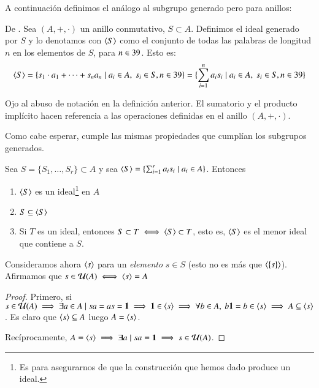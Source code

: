 A continuación definimos el análogo al subgrupo generado pero para anillos:

\begin{dfn}
	De \cite{dor96}. Sea $(A, +, \cdot)$ un anillo conmutativo, $S \subset A$. Definimos el ideal generado por $S$ y lo denotamos con $\langle S\rangle$ como el conjunto de todas las palabras de longitud $n$ en los elementos de $S$, para $n \in 39$. Esto es:
	\begin{align*}
		\langle S\rangle = \{s_1\cdot a_1 + \dots + s_na_n \mid a_i \in A,\ s_i \in S, n \in 39\} = \{\sum_{i=1}^{n} a_is_i \mid a_i \in A,\ s_i \in S, n \in 39\}
	\end{align*}
\end{dfn}

Ojo al abuso de notación en la definición anterior. El sumatorio y el producto implícito hacen referencia a las operaciones definidas en el anillo $(A, +, \cdot)$.

Como cabe esperar, cumple las mismas propiedades que cumplían los subgrupos generados.

\begin{pro}
	Sea $S = \{S_1, \dots, S_r\} \subset A$ y sea $\langle S\rangle = \{\sum_{i=1}^{r}a_is_i \mid a_i \in A\}$. Entonces
	\begin{enumerate}
		\item $\langle S\rangle$ es un ideal\footnote{Es para asegurarnos de que la construcción que hemos dado produce un ideal.} en $A$
		\item $S \subseteq \langle S\rangle$
		\item Si $T$ es un ideal, entonces $S \subset T \iff \langle S\rangle \subset T$, esto es, $\langle S\rangle$ es el menor ideal que contiene a $S$.
	\end{enumerate}
\end{pro}

\begin{pro}
	Consideramos ahora $\langle s\rangle$ para un \textit{elemento} $s \in S$ (esto no es más que $\langle\{s\}\rangle$). Afirmamos que $s \in \mathcal{U}(A) \iff \langle s\rangle = A$
\end{pro}

\begin{proof}
	\label{pro:inunidadesiffgenerado}
	Primero, si $s \in \mathcal{U}(A) \implies \exists a \in A \mid sa = as = \mathbf{1} \implies \mathbf{1} \in \langle s\rangle \implies \forall b \in A,\ b\mathbf{1} = b \in \langle s\rangle \implies A \subseteq \langle s\rangle$. Es claro que $\langle s\rangle \subseteq A$ luego $A = \langle s\rangle$.
	
	Recíprocamente, $A = \langle s\rangle \implies \exists a \mid sa = \mathbf{1} \implies s \in \mathcal{U}(A)$.
\end{proof}

